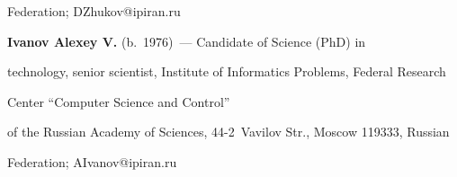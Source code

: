 Federation; \mbox{DZhukov@ipiran.ru}





\vspace*{3pt}





\noindent


\textbf{Ivanov Alexey V.} (b.\ 1976)~--- Candidate of Science (PhD) in 


technology, senior scientist, Institute of Informatics Problems, Federal Research 


Center ``Computer Science and Control''  


of the Russian Academy of Sciences, 44-2~Vavilov Str., Moscow 119333, Russian 


Federation; \mbox{AIvanov@ipiran.ru}





\label{end\stat}





\renewcommand{\bibname}{\protect\rm Литература}


